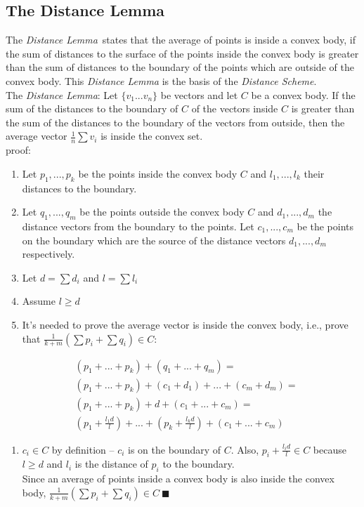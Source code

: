 \documentclass[10pt, conference]{IEEEtran}
\newcommand{\distanceScheme}{\textit{Distance Scheme}}
\newcommand{\distanceLemma}{\textit{Distance Lemma}}
\begin{document}
\subsection{The Distance Lemma}
The \distanceLemma \ states that the average of points is inside a convex body, if the sum of distances to the surface of the points inside the convex body is greater than the sum of distances to the boundary of the points which are outside of the convex body. This \textit{Distance Lemma} is the basis of the \distanceScheme . \\
The \distanceLemma : Let ${\{v_1 ... v_n\}}$ be vectors and let $C$ be a convex body. If the sum of the distances to the boundary of $C$ of the vectors inside $C$ is greater than the sum of the distances to the boundary of the vectors from outside, then the average vector ${\frac{1}{n}\sum {v_i}}$ is inside the convex set. \\
proof: \\
\begin{enumerate}
\item Let ${p_1 ,..., p_k}$ be the points inside the convex body $C$ and ${l_1 ,..., l_k}$ their distances to the boundary.
\item Let ${q_1 ,..., q_m}$ be the points outside the convex body $C$ and ${d_1 ,..., d_m}$ the distance vectors from the boundary to the points. Let ${c_1 ,..., c_m}$ be the points on the boundary which are the source of the distance vectors ${d_1 ,..., d_m}$ respectively.
\item Let ${d = \sum {d_i}}$ and ${l = \sum {l_i}}$
\item Assume $l \geq d$
\item It's needed to prove the average vector is inside the convex body, i.e., prove that ${\frac{1}{k+m}(\sum{p_i} + \sum{q_i}) \in C}$:
\end{enumerate}
\begin{equation}
\begin{aligned}
&( p_1+...+p_k) + (q_1+...+q_m) = \\
&( p_1+...+p_k) + (c_1+d_1) + ... + (c_m + d_m) = \\
&( p_1+...+p_k) + d + (c_1 + ... + c_m) = \\
&\left( p_1 + \frac{l_1 d}{l}\right) + ... + \left(p_k + \frac{l_k d}{l}\right) + (c_1 + ... + c_m)
\end{aligned}
\end{equation}
\begin{enumerate}
\item[\ \ \ ] ${c_i \in C}$ by definition -- $c_i$ is on the boundary of $C$. Also, ${p_i + \frac{l_i d}{l} \in C}$ because ${l \geq d}$ and $l_i$ is the distance of $p_i$ to the boundary. \\
Since an average of points inside a convex body is also inside the convex body, ${\frac{1}{k+m}(\sum{p_i} + \sum{q_i}) \in C \ \blacksquare} $ 
\end{enumerate}
\end{document}
